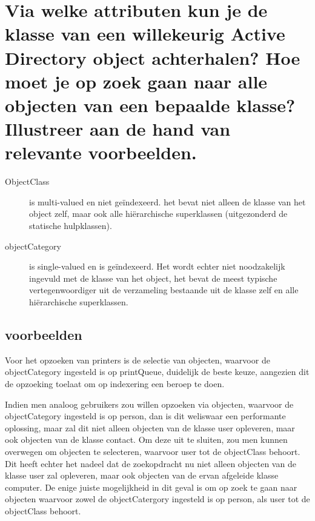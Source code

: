 \section{Via welke attributen kun je de klasse van een willekeurig Active
Directory object achterhalen? Hoe moet je op zoek gaan naar alle objecten van
een bepaalde klasse? Illustreer aan de hand van relevante voorbeelden.}

\begin{description}
	\item[ObjectClass] is multi-valued en niet geïndexeerd. het bevat niet
		alleen de klasse van het object zelf, maar ook alle
		hiërarchische superklassen (uitgezonderd de statische
		hulpklassen).
	\item[objectCategory] is single-valued en is geïndexeerd. Het wordt
		echter niet noodzakelijk ingevuld met de klasse van het object,
		het bevat de meest typische vertegenwoordiger uit de verzameling
		bestaande uit de klasse zelf en alle hiërarchische superklassen.
\end{description}

\subsection{voorbeelden}

Voor het opzoeken van printers is de selectie van objecten, waarvoor de
objectCategory ingesteld is op printQueue, duidelijk de beste keuze, aangezien
dit de opzoeking toelaat om op indexering een beroep te doen.

Indien men analoog gebruikers zou willen opzoeken via objecten, waarvoor de
objectCategory ingesteld is op person, dan is dit weliswaar een performante
oplossing, maar zal dit niet alleen objecten van de klasse user opleveren, maar
ook objecten van de klasse contact. Om deze uit te sluiten, zou men kunnen
overwegen om objecten te selecteren, waarvoor user tot de objectClass behoort.
Dit heeft echter het nadeel dat de zoekopdracht nu niet alleen objecten van de
klasse user zal opleveren, maar ook objecten van de ervan afgeleide klasse
computer. De enige juiste mogelijkheid in dit geval is om op zoek te gaan naar
objecten waarvoor zowel de objectCatergory ingesteld is op person, als user tot
de objectClass behoort.
